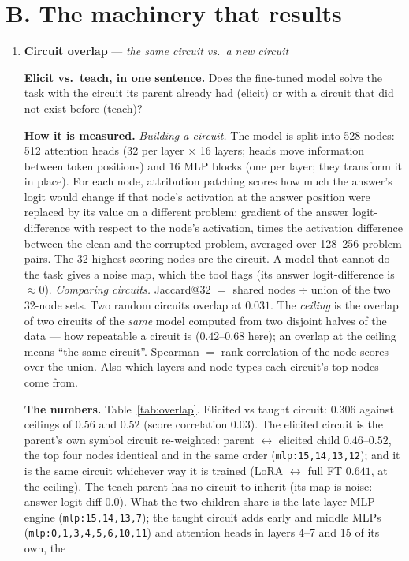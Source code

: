 \documentclass[11pt]{article}
\newcommand{\what}[1]{\par\noindent\textbf{Elicit vs.\ teach, in one sentence.} #1}
\newcommand{\how}[1]{\par\noindent\textbf{How it is measured.} #1}
\newcommand{\numbers}[1]{\par\noindent\textbf{The numbers.} #1\par\medskip}
\newcommand{\metricsec}[2]{\item \textbf{#1} --- \emph{#2}}
\begin{document}
\section*{B. The machinery that results}
\begin{enumerate}[label=\textbf{M\arabic*}, leftmargin=*, itemsep=1.2em, resume]

\metricsec{Circuit overlap}{the same circuit vs.\ a new circuit}
\what{Does the fine-tuned model solve the task with the circuit its parent already had (elicit)
or with a circuit that did not exist before (teach)?}
\how{\emph{Building a circuit.} The model is split into 528 nodes: 512 attention heads (32 per
layer $\times$ 16 layers; heads move information between token positions) and 16 MLP blocks (one
per layer; they transform it in place). For each node, attribution patching scores how much the
answer's logit would change if that node's activation at the answer position were replaced by its
value on a different problem: gradient of the answer logit-difference with respect to the node's
activation, times the activation difference between the clean and the corrupted problem, averaged
over 128--256 problem pairs. The 32 highest-scoring nodes are the circuit. A model that cannot do
the task gives a noise map, which the tool flags (its answer logit-difference is $\approx0$).
\emph{Comparing circuits.} Jaccard@32 $=$ shared nodes $\div$ union of the two 32-node sets. Two
random circuits overlap at $0.031$. The \emph{ceiling} is the overlap of two circuits of the
\emph{same} model computed from two disjoint halves of the data --- how repeatable a circuit is
($0.42$--$0.68$ here); an overlap at the ceiling means ``the same circuit''. Spearman $=$ rank
correlation of the node scores over the union. Also which layers and node types each circuit's top nodes come from.}
\numbers{Table~\ref{tab:overlap}. Elicited vs taught circuit: $0.306$ against ceilings of
$0.56$ and $0.52$ (score correlation $0.03$). The elicited circuit is the parent's own symbol
circuit re-weighted: parent $\leftrightarrow$ elicited child $0.46$--$0.52$, the top four nodes
identical and in the same order (\texttt{mlp:15,14,13,12}); and it is the same circuit whichever
way it is trained (LoRA $\leftrightarrow$ full FT $0.641$, at the ceiling). The teach parent has
no circuit to inherit (its map is noise: answer logit-diff $0.0$). What the two children share is
the late-layer MLP engine (\texttt{mlp:15,14,13,7}); the taught circuit adds early and middle
MLPs (\texttt{mlp:0,1,3,4,5,6,10,11}) and attention heads in layers 4--7 and 15 of its own, the
}
\end{enumerate}
\end{document}
